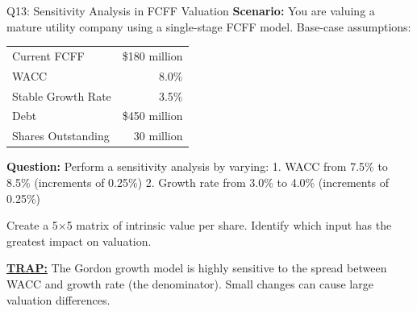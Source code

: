 \documentclass{beamer}
\renewcommand{\scriptsize}{\fontsize{6pt}{7pt}\selectfont}
\begin{document}
	\begin{frame}{Q13: Sensitivity Analysis in FCFF Valuation}
		\scriptsize
		\textbf{Scenario:} You are valuing a mature utility company using a single-stage FCFF model. Base-case assumptions:
		
		\begin{tabular}{lr}
			Current FCFF & \$180 million \\
			WACC & 8.0\% \\
			Stable Growth Rate & 3.5\% \\
			Debt & \$450 million \\
			Shares Outstanding & 30 million \\
		\end{tabular}
		
		\textbf{Question:} Perform a sensitivity analysis by varying:
		1. WACC from 7.5\% to 8.5\% (increments of 0.25\%) 
		2. Growth rate from 3.0\% to 4.0\% (increments of 0.25\%)
		
		Create a 5×5 matrix of intrinsic value per share. Identify which input has the greatest impact on valuation.
		
		\vspace{2pt}
		\underline{\textbf{TRAP:}} The Gordon growth model is highly sensitive to the spread between WACC and growth rate (the denominator). Small changes can cause large valuation differences.
	\end{frame}
	
\end{document}
